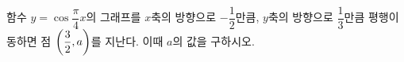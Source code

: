 함수 $y=\cos\dfrac{\pi}{4}x$의 그래프를 $x$축의 방향으로 $-\dfrac{1}{2}$만큼, $y$축의 방향으로 $\dfrac{1}{3}$만큼 평행이동하면 점 $\left(\dfrac{3}{2}{,}\mkern3mu\mathopen{} a\right)$를 지난다. 이때 $a$의 값을 구하시오.
